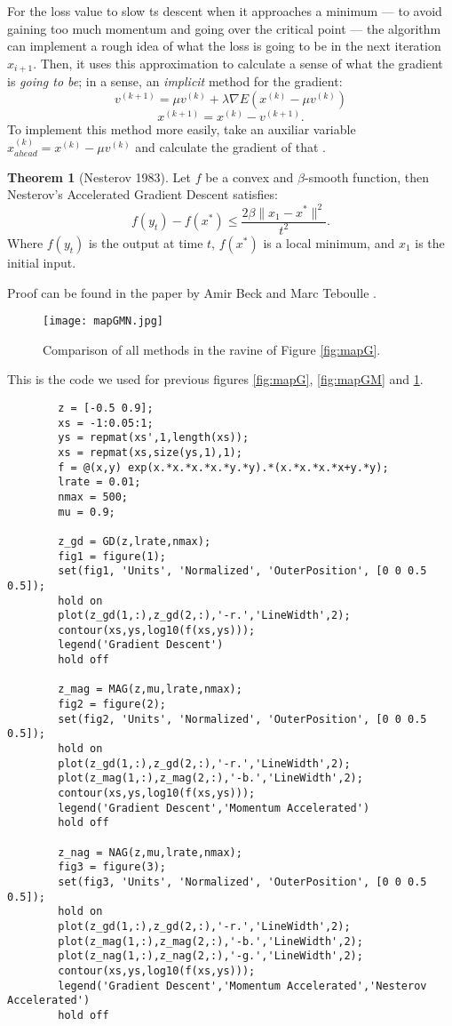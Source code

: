 \documentclass[titlepage]{article}
\theoremstyle{plain}
\theoremstyle{definition}
\newtheorem{theorem}[definition]{Theorem}
\begin{document}
		For the loss value to slow ts descent when it approaches a minimum --- to avoid gaining too much momentum and going over the critical point --- the algorithm can implement a rough idea of what the loss is going to be in the next iteration $x_{i+1}$. Then, it uses this approximation to calculate a sense of what the gradient is {\it going to be}; in a sense, an {\it implicit} method for the gradient:
		$$
		v^{(k+1)} = \mu v^{(k)} + \lambda \nabla E(x^{(k)} - \mu v^{(k)})
		$$ $$
		x^{(k+1)} = x^{(k)} - v^{(k+1)}.
		$$
		To implement this method more easily, take an auxiliar variable $x_{ahead}^{(k)} = x^{(k)} - \mu v^{(k)}$ and calculate the gradient of that \cite{Karpathy}.
		\begin{theorem}[Nesterov 1983]
			Let $f$ be a convex and $\beta$-smooth function, then Nesterov's Accelerated Gradient Descent satisfies:
			$$
			f(y_t) - f(x^\ast) \leq \frac{2\beta \lVert x_1 - x^\ast \rVert^2}{t^2}.
			$$
			Where $f(y_t)$ is the output at time $t$, $f(x^\ast)$ is a local minimum, and $x_1$ is the initial input.
		\end{theorem}
		Proof can be found in the paper by Amir Beck and Marc Teboulle \cite{Beck}.
		\begin{figure}[H]
			\centering
			\texttt{[image: mapGMN.jpg]}
			\caption{Comparison of all methods in the ravine of Figure \ref{fig:mapG}.}
			\label{fig:mapGMN}
		\end{figure}
		This is the code we used for previous figures \ref{fig:mapG}, \ref{fig:mapGM} and \ref{fig:mapGMN}.
		\begin{verbatim}
		z = [-0.5 0.9];
		xs = -1:0.05:1;
		ys = repmat(xs',1,length(xs));
		xs = repmat(xs,size(ys,1),1);
		f = @(x,y) exp(x.*x.*x.*x.*y.*y).*(x.*x.*x.*x+y.*y);
		lrate = 0.01;
		nmax = 500;
		mu = 0.9;
		
		z_gd = GD(z,lrate,nmax);
		fig1 = figure(1);
		set(fig1, 'Units', 'Normalized', 'OuterPosition', [0 0 0.5 0.5]);
		hold on
		plot(z_gd(1,:),z_gd(2,:),'-r.','LineWidth',2);
		contour(xs,ys,log10(f(xs,ys)));
		legend('Gradient Descent')
		hold off
		
		z_mag = MAG(z,mu,lrate,nmax);
		fig2 = figure(2);
		set(fig2, 'Units', 'Normalized', 'OuterPosition', [0 0 0.5 0.5]);
		hold on
		plot(z_gd(1,:),z_gd(2,:),'-r.','LineWidth',2);
		plot(z_mag(1,:),z_mag(2,:),'-b.','LineWidth',2);
		contour(xs,ys,log10(f(xs,ys)));
		legend('Gradient Descent','Momentum Accelerated')
		hold off
		
		z_nag = NAG(z,mu,lrate,nmax);
		fig3 = figure(3);
		set(fig3, 'Units', 'Normalized', 'OuterPosition', [0 0 0.5 0.5]);
		hold on
		plot(z_gd(1,:),z_gd(2,:),'-r.','LineWidth',2);
		plot(z_mag(1,:),z_mag(2,:),'-b.','LineWidth',2);
		plot(z_nag(1,:),z_nag(2,:),'-g.','LineWidth',2);
		contour(xs,ys,log10(f(xs,ys)));
		legend('Gradient Descent','Momentum Accelerated','Nesterov Accelerated')
		hold off
		\end{verbatim}
		
\end{document}
